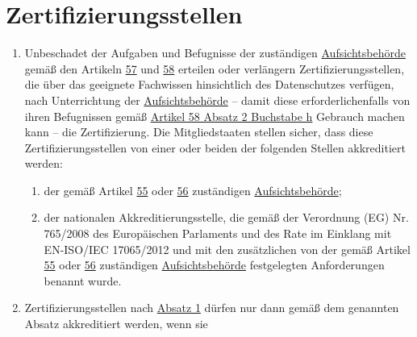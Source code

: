 \chapter{Zertifizierungsstellen}
\label{ch:43}

\begin{enumerate}

  \item Unbeschadet der Aufgaben und Befugnisse der zuständigen \hyperref[itm:04-21]{Aufsichtsbehörde} gemäß den
   Artikeln \hyperref[ch:57]{57} und \hyperref[ch:58]{58} erteilen oder verlängern Zertifizierungsstellen, die über das
   geeignete Fachwissen hinsichtlich des Datenschutzes verfügen, nach Unterrichtung der \hyperref[itm:04-21]
   {Aufsichtsbehörde} -- damit diese erforderlichenfalls von ihren Befugnissen gemäß \hyperref[itm:58-2h]{Artikel 58
   Absatz 2 Buchstabe h} Gebrauch machen kann -- die Zertifizierung. Die Mitgliedstaaten stellen sicher, dass diese
   Zertifizierungsstellen von einer oder beiden der folgenden Stellen akkreditiert werden:%
  \label{itm:43-1}

  \begin{enumerate}
  
    \item der gemäß Artikel \hyperref[ch:55]{55} oder \hyperref[ch:56]{56} zuständigen \hyperref[itm:04-21]
     {Aufsichtsbehörde};%
    \label{itm:43-1a}

    \item der nationalen Akkreditierungsstelle, die gemäß der Verordnung (EG) Nr. 765/2008 des Europäischen Parlaments und des
     Rate im Einklang mit EN-ISO/IEC 17065/2012 und mit den
     zusätzlichen von der gemäß Artikel \hyperref[ch:55]{55} oder \hyperref[ch:56]{56} zuständigen \hyperref[itm:04-21]
     {Aufsichtsbehörde} festgelegten Anforderungen benannt wurde.%
    \label{itm:43-1b}

  \end{enumerate}

  \item Zertifizierungsstellen nach \hyperref[itm:43-1]{Absatz 1} dürfen nur dann gemäß dem genannten Absatz
   akkreditiert werden, wenn sie%
  \label{itm:43-2}


\end{enumerate}
